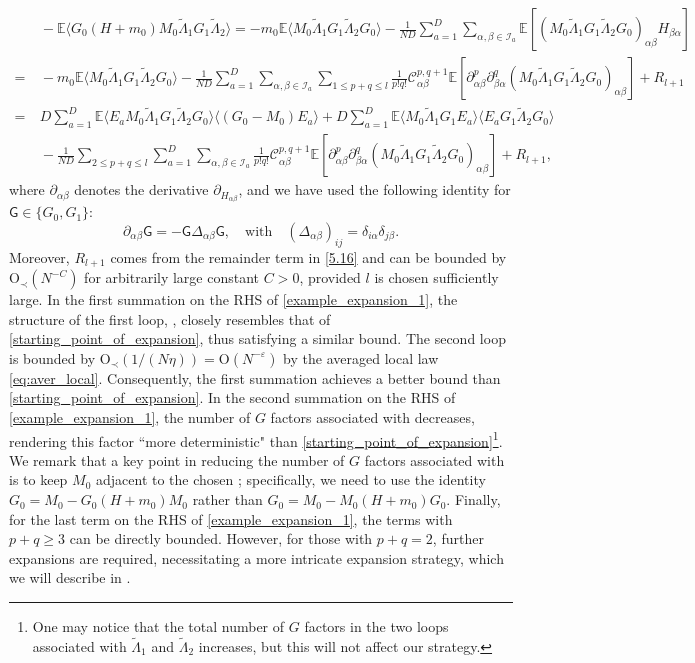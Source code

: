 \documentclass[10pt,reqno]{amsart}
\numberwithin{equation}{section}
\numberwithin{figure}{section}
\theoremstyle{plain} %
\theoremstyle{definition} %
\newcommand{\wt}{\widetilde}
\newcommand{\E}{\mathbb{E}}
\newcommand{\cI}{\mathcal{I}}
\newcommand{\cC}{\mathcal{C}}
\newcommand{\sG}{\mathsf G}
\renewcommand{\leq}{\le}
\renewcommand{\geq}{\ge}
\newcommand{\p}[1]{({#1})}
\newcommand{\pa}[1]{\left({#1}\right)}
\newcommand{\qa}[1]{\left[{#1}\right]}
\newcommand{\avg}[1]{\langle #1 \rangle}
\newcommand{\tLambda}{{\wt{\Lambda}}}
\newcommand{\OO}{\mathrm{O}}
\newcommand{\iab}{\alpha\beta}
\newcommand{\iba}{\beta\alpha}
\newcommand{\tl}{\tLambda}
\newcommand{\opr}[1]{\mathrm{O}_\prec\left({#1}\right)}
\numberwithin{equation}{section}
\begin{document}
    \begin{align}
        &~-\E\avg{G_0\pa{H+m_{0}}M_0\tLambda_1 G_1\tLambda_2}=-m_{0}\E\avg{M_0\tLambda_1 G_1\tLambda_2 G_0}-\frac{1}{ND}\sum_{a=1}^D\sum_{\alpha,\beta\in \cI_a}\E\qa{\p{M_0\tLambda_1 G_1\tLambda_2 G_0}_{\alpha\beta}H_{\iba}}\nonumber\\
        =&~-m_{0}\E\avg{M_0\tLambda_1 G_1\tLambda_2 G_0}-\frac{1}{ND}\sum_{a=1}^D\sum_{\alpha,\beta\in \cI_a}\sum_{1\leq p+q\leq l}\frac{1}{p!q!}\cC_{\iab}^{p,q+1}\E\qa{\partial_{\iab}^p\partial_{\iba}^{q}\p{M_0\tLambda_1 G_1\tLambda_2 G_0}_{\alpha\beta}}+R_{l+1}\nonumber\\
        =&~D\sum_{a=1}^D\E\avg{ E_a M_0\tLambda_1 G_1\tLambda_2 G_0}\avg{\pa{G_0-M_0}E_a}+D\sum_{a=1}^D\E\avg{M_0\tl_1 G_1E_a}\avg{E_a G_1\tl_2 G_0}\nonumber\\
        &~-\frac{1}{ND}\sum_{2\leq p+q\leq l}\sum_{a=1}^D\sum_{\alpha,\beta\in \cI_a}\frac{1}{p!q!}\cC_{\iab}^{p,q+1}\E\qa{\partial_{\iab}^p\partial_{\iba}^{q}\p{M_0\tLambda_1 G_1\tLambda_2 G_0}_{\alpha\beta}}+R_{l+1},\label{example_expansion_1}
    \end{align}
where $\partial_{\iab}$ denotes the derivative $\partial_{H_{\iab}}$, and we have used the following identity for $\sG\in \{G_0,G_1\}$:
\[\partial_{\iab}\sG=-\sG\Delta_{\iab}\sG,\quad  \text{with}\quad \pa{\Delta_{\iab}}_{ij}=\delta_{i\alpha}\delta_{j\beta}.\] 
Moreover, $R_{l+1}$ comes from the remainder term in \eqref{5.16} and can be bounded by $\opr{N^{-C}}$ for arbitrarily large constant $C>0$, provided $l$ is chosen sufficiently large. In the first summation on the RHS of \eqref{example_expansion_1}, the structure of the first loop, \smash{$\avg{ E_a M_0\tLambda_1 G_1\tLambda_2 G_0}$}, closely resembles that of \eqref{starting_point_of_expansion}, thus satisfying a similar bound. The second loop \smash{$\avg{\pa{G_0-M_0}E_a}$} is bounded by $\opr{1/\pa{N\eta}}=\OO( N^{-\varepsilon})$ by the averaged local law \eqref{eq:aver_local}. Consequently, the first summation achieves a better bound than \eqref{starting_point_of_expansion}.
In the second summation on the RHS of \eqref{example_expansion_1}, the number of $G$ factors associated with \smash{$\tl_1$} decreases, rendering this factor ``more deterministic" than \eqref{starting_point_of_expansion}\footnote{One may notice that the total number of $G$ factors in the two loops associated with $\tl_1$ and $\tl_2$ increases, but this will not affect our strategy.}. 
We remark that a key point in reducing the number of $G$ factors associated with \smash{$\tl_1$} is to keep $M_0$ adjacent to the chosen \smash{$\tl_1$}; specifically, we need to use the identity $G_0=M_0-G_0\pa{H+m_{0}}M_0$ rather than $G_0=M_0-M_0\pa{H+m_{0}}G_0$. 
Finally, for the last term on the RHS of \eqref{example_expansion_1}, the terms with $p+q\geq 3$ can be directly bounded. However, for those with $p+q=2$, further expansions are required, necessitating a more intricate expansion strategy, which we will describe in .
\end{document}

